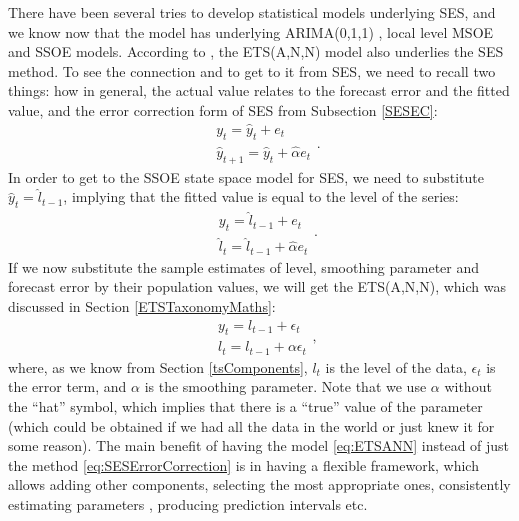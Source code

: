 \documentclass[
]{book}
\theoremstyle{definition}
\theoremstyle{definition}
\theoremstyle{definition}
\theoremstyle{definition}
\theoremstyle{remark}
\begin{document}
There have been several tries to develop statistical models underlying SES, and we know now that the model has underlying ARIMA(0,1,1) \citep{Muth1960}, local level MSOE \citep[Multiple Source of Error,][]{Muth1960} and SSOE \citep[Single Source of Error,][]{Snyder1985} models. According to \citet{Hyndman2002}, the ETS(A,N,N) model also underlies the SES method. To see the connection and to get to it from SES, we need to recall two things: how in general, the actual value relates to the forecast error and the fitted value, and the error correction form of SES from Subsection \ref{SESEC}:
\begin{equation}
  \begin{aligned}
    & y_t = \hat{y}_{t} + e_t \\
    & \hat{y}_{t+1} = \hat{y}_{t} + \hat{\alpha} e_{t}
  \end{aligned} .
  \label{eq:ETSANNDerivation01}
\end{equation}
In order to get to the SSOE state space model for SES, we need to substitute \(\hat{y}_t=\hat{l}_{t-1}\), implying that the fitted value is equal to the level of the series:
\begin{equation}
  \begin{aligned}
    & y_t = \hat{l}_{t-1} + e_t \\
    & \hat{l}_{t} = \hat{l}_{t-1} + \hat{\alpha} e_{t}
  \end{aligned} .
  \label{eq:ETSANN01}
\end{equation}
If we now substitute the sample estimates of level, smoothing parameter and forecast error by their population values, we will get the ETS(A,N,N), which was discussed in Section \ref{ETSTaxonomyMaths}:
\begin{equation}
  \begin{aligned}
    & y_{t} = l_{t-1} + \epsilon_t \\
    & l_t = l_{t-1} + \alpha \epsilon_t
  \end{aligned} ,
  \label{eq:ETSANN}
\end{equation}
where, as we know from Section \ref{tsComponents}, \(l_t\) is the level of the data, \(\epsilon_t\) is the error term, and \(\alpha\) is the smoothing parameter. Note that we use \(\alpha\) without the ``hat'' symbol, which implies that there is a ``true'' value of the parameter (which could be obtained if we had all the data in the world or just knew it for some reason). The main benefit of having the model \eqref{eq:ETSANN} instead of just the method \eqref{eq:SESErrorCorrection} is in having a flexible framework, which allows adding other components, selecting the most appropriate ones, consistently estimating parameters \citep[see Section 4.3 of][]{SvetunkovSBA}, producing prediction intervals etc.
\end{document}
